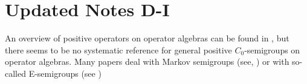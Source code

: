 \section{Updated Notes D-I}
An overview of positive operators on operator algebras can be found in , but there seems to be no systematic reference for general positive 
$C_{0}$-semigroups on operator algebras.
Many papers deal with Markov semigroups (see, \eg {}) or with so-called E-semigroups
(see )